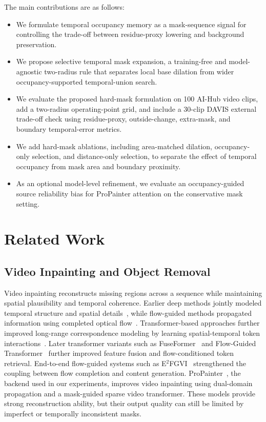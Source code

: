 \documentclass[nouppercase]{kaia}
\begin{document}
The main contributions are as follows:
\begin{itemize}
    \item We formulate temporal occupancy memory as a mask-sequence signal for controlling the trade-off between residue-proxy lowering and background preservation.
    \item We propose selective temporal mask expansion, a training-free and model-agnostic two-radius rule that separates local base dilation from wider occupancy-supported temporal-union search.
    \item We evaluate the proposed hard-mask formulation on 100 AI-Hub video clips, add a two-radius operating-point grid, and include a 30-clip DAVIS external trade-off check using residue-proxy, outside-change, extra-mask, and boundary temporal-error metrics.
    \item We add hard-mask ablations, including area-matched dilation, occupancy-only selection, and distance-only selection, to separate the effect of temporal occupancy from mask area and boundary proximity.
    \item As an optional model-level refinement, we evaluate an occupancy-guided source reliability bias for ProPainter attention on the conservative mask setting.
\end{itemize}

\section{Related Work}
\subsection{Video Inpainting and Object Removal}
Video inpainting reconstructs missing regions across a sequence while maintaining spatial plausibility and temporal coherence. Earlier deep methods jointly modeled temporal structure and spatial details~\cite{wang2018video}, while flow-guided methods propagated information using completed optical flow~\cite{xu2019deep}. Transformer-based approaches further improved long-range correspondence modeling by learning spatial-temporal token interactions~\cite{zeng2020sttn}. Later transformer variants such as FuseFormer~\cite{liu2021fuseformer} and Flow-Guided Transformer~\cite{zhang2022fgt} further improved feature fusion and flow-conditioned token retrieval. End-to-end flow-guided systems such as E$^2$FGVI~\cite{li2022e2fgvi} strengthened the coupling between flow completion and content generation. ProPainter~\cite{zhou2023propainter}, the backend used in our experiments, improves video inpainting using dual-domain propagation and a mask-guided sparse video transformer. These models provide strong reconstruction ability, but their output quality can still be limited by imperfect or temporally inconsistent masks.
\end{document}
